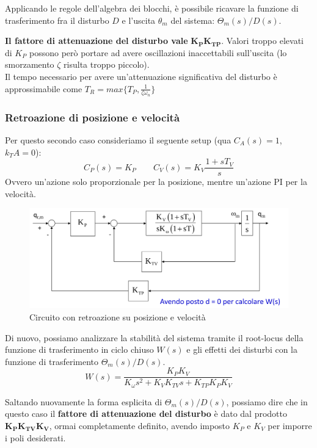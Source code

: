 Applicando le regole dell'algebra dei blocchi, è possibile ricavare la funzione di trasferimento fra il disturbo $D$ e l’uscita $\theta_m$ del sistema: $\Theta_m(s) / D(s)$.

\textbf{Il fattore di attenuazione del disturbo vale} $\mathbf{K_PK_{TP}}$. Valori troppo elevati di $K_P$ possono però portare ad avere oscillazioni inaccettabili sull’uscita (lo smorzamento $\zeta$ risulta troppo piccolo).\\
Il tempo necessario per avere un’attenuazione significativa del disturbo è approssimabile come $T_R = max\{T_P, \frac{1}{\zeta \omega_n}\}$








\vspace{35pt}
\subsubsection{Retroazione di posizione e velocità}

Per questo secondo caso consideriamo il seguente setup (qua $C_A(s)=1$, $k_TA=0$):
$$
C_P(s) = K_P \qquad C_V(s)=K_V\frac{1+sT_V}{s}
$$
Ovvero un'azione solo proporzionale per la posizione, mentre un'azione PI per la velocità.

\begin{figure}[ht!]
	\centering
	\includegraphics[width=0.7\linewidth]{images/decentralized_joint_space_control_7}
	\caption{Circuito con retroazione su posizione e velocità}
	\label{fig:decentralizedjointspacecontrol7}
\end{figure}


Di nuovo, possiamo analizzare la stabilità del sistema tramite il root-locus della funzione di trasferimento in ciclo chiuso $W(s)$ e gli effetti dei disturbi con la funzione di trasferimento $\Theta_m(s)/D(s)$.
$$
W(s)=\frac{K_P K_V}{K_\omega s^2 + K_V K_{TV} s + K_{TP} K_P K_V}
$$

Saltando nuovamente la forma esplicita di $\Theta_m(s)/D(s)$, possiamo dire che in questo caso il \textbf{fattore di attenuazione del disturbo} è dato dal prodotto $\mathbf{K_P K_{TV} K_V}$, ormai completamente definito, avendo imposto $K_P$ e $K_V$ per imporre i poli desiderati.


